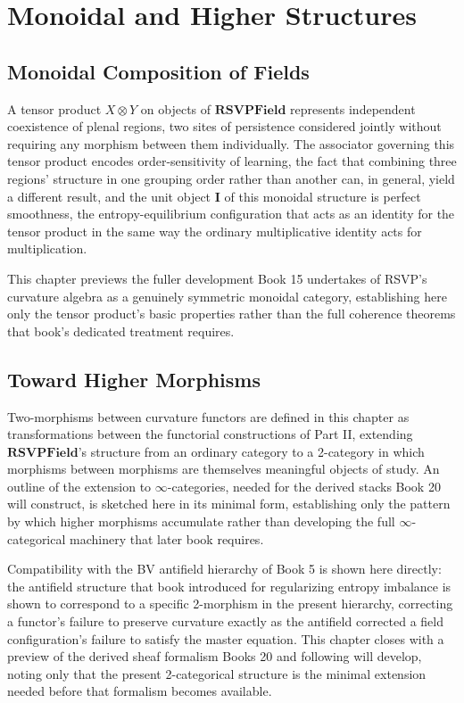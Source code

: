 \part{Monoidal and Higher Structures}

\chapter{Monoidal Composition of Fields}

A tensor product $X \otimes Y$ on objects of $\mathbf{RSVPField}$ represents independent coexistence of plenal regions, two sites of persistence considered jointly without requiring any morphism between them individually. The associator governing this tensor product encodes order-sensitivity of learning, the fact that combining three regions' structure in one grouping order rather than another can, in general, yield a different result, and the unit object $\mathbf{I}$ of this monoidal structure is perfect smoothness, the entropy-equilibrium configuration that acts as an identity for the tensor product in the same way the ordinary multiplicative identity acts for multiplication.

This chapter previews the fuller development Book 15 undertakes of RSVP's curvature algebra as a genuinely symmetric monoidal category, establishing here only the tensor product's basic properties rather than the full coherence theorems that book's dedicated treatment requires.

\chapter{Toward Higher Morphisms}

Two-morphisms between curvature functors are defined in this chapter as transformations between the functorial constructions of Part II, extending $\mathbf{RSVPField}$'s structure from an ordinary category to a 2-category in which morphisms between morphisms are themselves meaningful objects of study. An outline of the extension to $\infty$-categories, needed for the derived stacks Book 20 will construct, is sketched here in its minimal form, establishing only the pattern by which higher morphisms accumulate rather than developing the full $\infty$-categorical machinery that later book requires.

Compatibility with the BV antifield hierarchy of Book 5 is shown here directly: the antifield structure that book introduced for regularizing entropy imbalance is shown to correspond to a specific 2-morphism in the present hierarchy, correcting a functor's failure to preserve curvature exactly as the antifield corrected a field configuration's failure to satisfy the master equation. This chapter closes with a preview of the derived sheaf formalism Books 20 and following will develop, noting only that the present 2-categorical structure is the minimal extension needed before that formalism becomes available.

